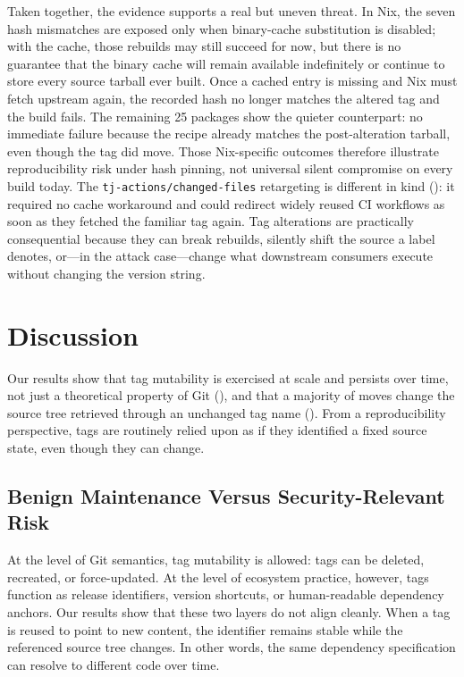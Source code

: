 Taken together, the evidence supports a real but uneven threat.
In Nix, the seven hash mismatches are exposed only when binary-cache substitution is disabled; with the cache, those rebuilds may still succeed for now, but there is no guarantee that the binary cache will remain available indefinitely or continue to store every source tarball ever built.
Once a cached entry is missing and Nix must fetch upstream again, the recorded hash no longer matches the altered tag and the build fails.
The remaining \num{25} packages show the quieter counterpart: no immediate failure because the recipe already matches the post-alteration tarball, even though the tag did move.
Those Nix-specific outcomes therefore illustrate reproducibility risk under hash pinning, not universal silent compromise on every build today.
The \texttt{tj-actions/changed-files} retargeting is different in kind (): it required no cache workaround and could redirect widely reused CI workflows as soon as they fetched the familiar tag again.
Tag alterations are practically consequential because they can break rebuilds, silently shift the source a label denotes, or---in the attack case---change what downstream consumers execute without changing the version string.

\section{Discussion}
\label{sec:tags-discussion}

Our results show that tag mutability is exercised at scale and persists over time, not just a theoretical property of Git (), and that a majority of moves change the source tree retrieved through an unchanged tag name ().
From a reproducibility perspective, tags are routinely relied upon as if they identified a fixed source state, even though they can change.

\subsection{Benign Maintenance Versus Security-Relevant Risk}
\label{subsec:tags-disc-benign-vs-security}

At the level of Git semantics, tag mutability is allowed: tags can be deleted, recreated, or force-updated.
At the level of ecosystem practice, however, tags function as release identifiers, version shortcuts, or human-readable dependency anchors.
Our results show that these two layers do not align cleanly.
When a tag is reused to point to new content, the identifier remains stable while the referenced source tree changes.
In other words, the same dependency specification can resolve to different code over time.


